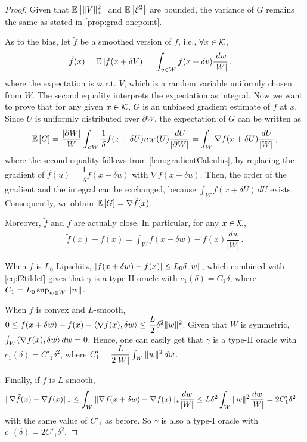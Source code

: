 \begin{proof}
Given that $\mathbb{E}\left[\|V\|_*^2\right]$ and $\mathbb{E}\left[\xi^2\right]$ are bounded, the variance of $G$ remains the same as stated in \cref{prop:grad-onepoint}.

As to the bias, let $\tilde{f}$ be a smoothed version of $f$, i.e., $\forall x \in \mathcal{K}$,
\begin{align*}
\tilde{f}(x) &= \mathbb{E}\left[f(x+\delta V)\right] =\int_{v \in W} f(x+\delta v)\dfrac{\,d w}{\lvert W\rvert}\,,
\end{align*}
where the expectation is w.r.t. $V$, which is a random variable uniformly chosen from $W$. The second equality interprets the expectation as integral.
Now we want to prove that for any given $x\in \mathcal{K}$, $G$ is an unbiased gradient estimate of $\tilde{f}$ at $x$.
Since $U$ is uniformly distributed over $\partial W$,  the expectation of $G$ can be written as
\begin{align*}
\mathbb{E}\left[G\right] =\dfrac{\lvert \partial W\rvert}{\lvert W \rvert} \int_{\partial W} \dfrac{1}{\delta} f(x+\delta U)n_W(U)\dfrac{\,d U}{\lvert \partial W\rvert}
=  \int_W \nabla f(x+\delta U)\dfrac{\,d U}{\lvert W\rvert}\,,
\end{align*}
where the second equality follows from \cref{lem:gradientCalculus}, by replacing the gradient of $\hat{f}(u) =\dfrac{1}{\delta} f(x+\delta u) $ with $\nabla f(x+\delta u)$.
Then, the order of the gradient and the integral can be exchanged, because $\int_W f(x+\delta U)\,d U$ exists. Consequently, we obtain $\mathbb{E}\left[G\right] = \nabla \tilde{f}(x)$.

Moreover, $\tilde{f}$ and $f$ are actually close. In particular, for any $x \in \mathcal{K}$,
\begin{align}
\label{eq:f2tildef}
\tilde{f}(x)-f(x) =\int_{ W} f(x+\delta w)-f(x)\dfrac{\,d w}{\lvert W\rvert} \,.
\end{align}

When $f$ is $L_0$-Lipschitz, $\vert f(x+\delta w)-f(x)\vert \le L_0\delta \|w\|$, which combined with \eqref{eq:f2tildef} gives that $\gamma$ is a type-II oracle with $c_1(\delta) = C_1 \delta$, where $C_1 = L_0 \sup_{w\in W}\|w\|$.

When $f$ is convex and $L$-smooth,  $0\le f(x+\delta w)-f(x) - \langle \nabla f(x), \delta w \rangle\le\dfrac{L}{2}\delta^2 \|w\|^2$. Given that $W$ is symmetric, $\int_{ W} \langle \nabla f(x), \delta w \rangle \,d w=0$. Hence, one can easily get that $\gamma$ is a type-II oracle with $c_1(\delta)=C'_1 \delta^2$, where $C'_1 = \dfrac{L}{2 |W|}\int_{ W}\|w\|^2\,d w$.

Finally, if $f$ is $L$-smooth,
\begin{align*}
\|\nabla \tilde{f}(x)- \nabla f(x)\|_*
&\le \int_W \|\nabla f(x+\delta w) - \nabla f(x)\|_* \frac{dw}{|W|}
\le L\delta^2\int_W \|w\|^2 \frac{dw}{|W|} =2 C'_1 \delta^2
\end{align*}
with the same value of $C'_1$ as before. So $\gamma$ is also a  type-I oracle with $c_1(\delta)=2C'_1 \delta^2$.
\end{proof}
